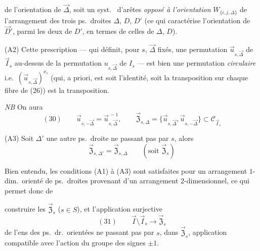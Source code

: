 \documentclass[11pt,a4paper]{article}
\begin{document}
de l'orientation de $\vec{\Delta}$, soit un syst.\ \struck{\ill{}} d'arêtes \emph{opposé à l'orientation}  $W_{\lbrace i, j, \Delta \rbrace}$ de l'arrangement des trois ps.\ droites $\Delta$, $D$, $D'$ (ce qui caractérise l'orientation de $\vec{D}'$, parmi les deux de $D'$, en termes de celles de $\Delta$, $D$).

(A2) Cette prescription --- qui définit, pour $s$, $\vec{\Delta}$ fixés, une permutation $\vec{u}_{s,\vec{\Delta}}$ de $\vec{I}_s$ au-dessus de la permutation $u_{s,\vec{\Delta}}$ de $I_s$ --- est bien une permutation \emph{circulaire}  i.e.\ $(\vec{u}_{s,\vec{\Delta}})^{\nu_s}$ (qui, a priori, est soit l'identité, soit la \struck{\ill{}} transposition sur chaque fibre de (26))  est la transposition.


\emph{NB} On aura \struck{\ill{}}
\[
(30) \qquad \vec{u}_{s,-\vec{\Delta}} = \vec{u}_{s,\vec{\Delta}}^{\,-1} , \qquad
\vec{\mathfrak{Z}}_{s,\Delta} = \lbrace \vec{u}_{s,\vec{\Delta}}, \vec{u}_{s,-\vec{\Delta}} \rbrace \subset \mathcal{C}_{\vec{I}_s}
\]

(A3) Soit $\Delta'$ une autre ps.\ droite ne passant pas par $s$, alors
\[
\vec{\mathfrak{Z}}_{s,\Delta'} = \vec{\mathfrak{Z}}_{s,\Delta} \qquad (\text{soit } \vec{\mathfrak{Z}}_s)
\]

Bien entendu, les conditions (A1) à (A3) sont satisfaites pour un arrangement $1$-dim.\ orienté de ps.\ droites provenant d'un arrangement $2$-dimensionnel, ce qui permet donc de

construire les $\vec{\mathfrak{Z}}_s$ ($s \in S$), et  l'application surjective
\[
(31) \qquad \vec{I} \setminus \vec{I}_s \longrightarrow \vec{\mathfrak{Z}}_s
\]
de l'ens des ps.\ dr.\ orientées ne passant pas par $s$, dans $\vec{\mathfrak{Z}}_s$, application compatible avec l'action du groupe des signes $\pm 1$.
\end{document}
